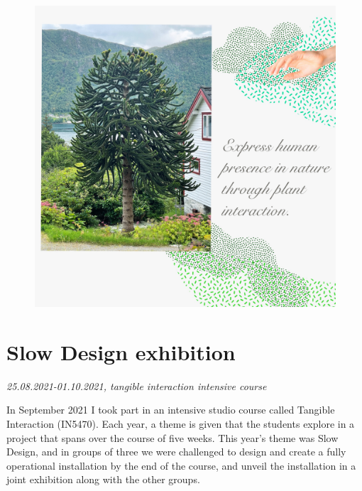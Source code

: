 \begin{figure}[H]
\includegraphics[width=13cm]{pictures/human_presence.jpg}
\centering 
\end{figure}


\section{Slow Design exhibition}
\par
\emph{25.08.2021-01.10.2021, tangible interaction intensive course}
\par

In September 2021 I took part in an intensive studio course called Tangible Interaction (IN5470). Each year, a theme is given that the students explore in a project that spans over the course of five weeks. This year's theme was Slow Design, and in groups of three we were challenged to design and create a fully operational installation by the end of the course, and unveil the installation in a joint exhibition along with the other groups. 

